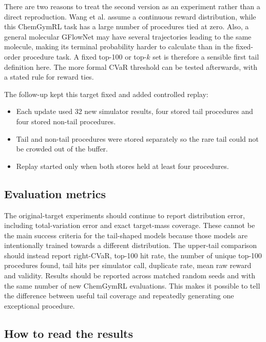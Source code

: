 \documentclass{article}
\begin{document}
There are two reasons to treat the second version as an experiment rather than a direct reproduction. Wang et al. assume a continuous reward distribution, while this ChemGymRL task has a large number of procedures tied at zero. Also, a general molecular GFlowNet may have several trajectories leading to the same molecule, making its terminal probability harder to calculate than in the fixed-order procedure task. A fixed top-100 or top-$k$ set is therefore a sensible first tail definition here. The more formal CVaR threshold can be tested afterwards, with a stated rule for reward ties.

The follow-up kept this target fixed and added controlled replay:
\begin{itemize}
    \item Each update used 32 new simulator results, four stored tail procedures and four stored non-tail procedures.
    \item Tail and non-tail procedures were stored separately so the rare tail could not be crowded out of the buffer.
    \item Replay started only when both stores held at least four procedures.
\end{itemize}

\subsection{Evaluation metrics}

The original-target experiments should continue to report distribution error, including total-variation error and exact target-mass coverage. These cannot be the main success criteria for the tail-shaped models because those models are intentionally trained towards a different distribution. The upper-tail comparison should instead report right-CVaR, top-100 hit rate, the number of unique top-100 procedures found, tail hits per simulator call, duplicate rate, mean raw reward and validity. Results should be reported across matched random seeds and with the same number of new ChemGymRL evaluations. This makes it possible to tell the difference between useful tail coverage and repeatedly generating one exceptional procedure.

\subsection{How to read the results}
\end{document}
